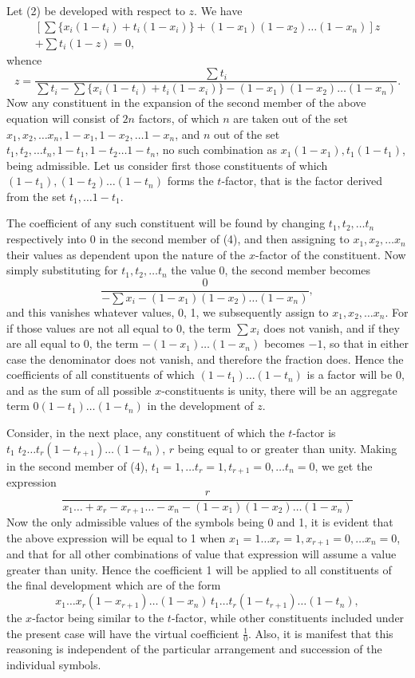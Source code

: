 \documentclass[oneside]{book}
\begin{document}
Let (2) be developed with respect to $z$. We have
\begin{multline*}
  \left[ \sum\{ x_i (1-t_i) + t_i(1-x_i ) \}
         + (1-x_1)(1-x_2) \dotsc (1-x_n) \right] z \\
  + \sum t_i(1-z) = 0,
\end{multline*}
whence
\[
  z = \frac{ \sum t_i }
           { \sum t_i - \sum\{ x_i (1-t_i) + t_i(1-x_i) \}
             - (1-x_1)(1-x_2) \dotsc (1-x_n) }.   \tag{4}
\]
Now any constituent in the expansion of the second member of
the above equation will consist of $2n$ factors, of which $n$ are taken
out of the set $x_1, x_2, \dotsc x_n, 1-x_1, 1-x_2, \dotsc 1-x_n$, and $n$ out of
the set $t_1, t_2, \dotsc t_n, 1-t_1, 1-t_2 \dotsc 1-t_n$, no such combination as
$x_1(1-x_1), t_1(1-t_1)$, being admissible. Let us consider first
those constituents of which $(1-t_1), (1-t_2) \dotsc (1-t_n)$ forms the
$t$-factor, that is the factor derived from the set
$t_1,\dotsc 1-t_1$.

The coefficient of any such constituent will be found by
changing $t_1, t_2, \dotsc t_n$ respectively into $0$ in the second member of
(4), and then assigning to $x_1, x_2, \dotsc x_n$ their values as dependent
upon the nature of the $x$-factor of the constituent. Now simply
substituting for $t_1, t_2, \dotsc t_n$ the value $0$, the second member becomes
\[
  \frac{0}{ -\sum x_i - (1-x_1)(1-x_2) \dotsc (1-x_n) },
\]
and this vanishes whatever values, 0, 1, we subsequently assign
to $x_1, x_2, \dotsc x_n$. For if those values are not all equal to 0, the
term $\sum x_i$ does not vanish, and if they are all equal to 0, the term
$-(1-x_1) \dotsc (1-x_n)$ becomes $-1$, so that in either case the denominator
does not vanish, and therefore the fraction does. Hence
the coefficients of all constituents of which $(1-t_1) \dotsc (1-t_n)$ is a
factor will be 0, and as the sum of all possible $x$-constituents is
unity, there will be an aggregate term $0(1-t_1)\dotsc (1-t_n)$ in the
development of $z$.

Consider, in the next place, any constituent of which the
$t$-factor is $t_1\; t_2 \dotsc t_r(1-t_{r+1}) \dotsc (1-t_n)$, $r$ being equal
to or greater
than unity. Making in the second member of (4),
$t_1 = 1,\dotsc t_r = 1, t_{r+1} = 0, \dotsc t_n = 0$, we get the expression
\[
  \frac{r}{x_1\dotsc + x_r - x_{r+1} \dotsc - x_n
           - (1-x_1)(1-x_2)\dotsc (1-x_n)}
\]
Now the only admissible values of the symbols being 0 and 1,
it is evident that the above expression will be equal to 1 when
$x_1 = 1\dotsc x_r = 1, x_{r+1} = 0,\dotsc x_n = 0$, and that for all other
combinations of value that expression will assume a value greater than
unity. Hence the coefficient 1 will be applied to all constituents
of the final development which are of the form
\[
  x_1\dotsc x_r(1-x_{r+1})\dotsc (1-x_n)\,
  t_1\dotsc t_r(1-t_{r+1})\dotsc (1-t_n),
\]
the $x$-factor being similar to the $t$-factor, while other constituents
included under the present case will have the virtual coefficient $\frac{1}{0}$.
Also, it is manifest that this reasoning is independent
of the particular arrangement and succession of the individual
symbols.
\end{document}
